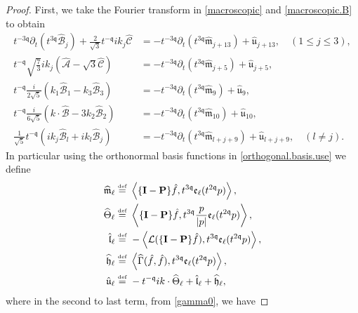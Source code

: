 \documentclass[reqno]{amsart}
\newcommand{\eqdef }{\overset{\mbox{\tiny{def}}}{=}}
\newcommand{\pv}{p}
\newcommand{\irnp}[2]{\left\langle {#1},{#2} \right\rangle}
\newcommand{\qq}{\mathfrak{q}}
\newcommand{\tmq}{t^{-\qq}}
\newcommand{\tqq}{t^{2\qq}}
\newcommand{\tTq}{t^{3\qq}}
\newcommand{\tmTq}{t^{-3\qq}}
\newcommand{\linL}{\mathcal{L}}
\newcommand{\micro}{{\bf \{I- P\}}}
\newcommand{\highG}{\Theta}
\theoremstyle{definition}
\numberwithin{equation}{section}
\numberwithin{theorem}{section}
\begin{document}
\begin{proof}
First, we take the Fourier transform in \eqref{macroscopic} and \eqref{macroscopic.B} to obtain 
\begin{align} \label{macroscopic.FT.B}
 \tmTq\partial_t \left(\tTq \widehat{\mathcal{B}}_j \right) 
 +
\frac{2}{\sqrt{3}}\tmq ik_j  \widehat{\mathcal{C}} 
&=
-\tmTq  \partial_t\left( \tTq \widehat{\mathfrak{m}}_{j+13} \right)+\hat{\mathfrak{u}}_{j+13} , \quad (1 \leq j \leq 3),
\\ 
\label{macroscopic.FT.AC}
\tmq\sqrt{\frac{7}{3}}ik_j \left(\widehat{\mathcal{A}}
-
\sqrt{3}\widehat{\mathcal{C}} \right)
&=-\tmTq  \partial_t\left( \tTq \widehat{\mathfrak{m}}_{j+5} \right)+\hat{\mathfrak{u}}_{j+5},
\\ \label{macroscopic.FT.Bthree}
\tmq\frac{i}{2\sqrt{5}} \left( k_1 \widehat{\mathcal{B}}_1 - k_3 \widehat{\mathcal{B}}_3\right)
&=-\tmTq  \partial_t\left( \tTq \widehat{\mathfrak{m}}_{9} \right)+\widehat{\mathfrak{u}}_{9},
 \\ \label{macroscopic.FT.Btwo}
\tmq\frac{i}{6\sqrt{5}}\left( k\cdot \widehat{\mathcal{B}}-3k_2 \widehat{\mathcal{B}}_2\right)
&=-\tmTq  \partial_t\left( \tTq \widehat{\mathfrak{m}}_{10} \right)+\widehat{\mathfrak{u}}_{10},
 \\ \label{macroscopic.FT.Bjl}
\frac{1}{\sqrt{5}}  \tmq\left(ik_j \widehat{\mathcal{B}}_l+ik_l \widehat{\mathcal{B}}_j \right)
&=-\tmTq  \partial_t\left( \tTq \widehat{\mathfrak{m}}_{l+j+9} \right)+\hat{\mathfrak{u}}_{l+j+9},
\quad (l\neq j).
\end{align}
In particular using the orthonormal basis functions in \eqref{orthogonal.basis.use} we define
\begin{align} \notag
\widehat{\mathfrak{m}}_{\ell} \eqdef &~  \irnp{  \micro \hat{f}}{\tTq \mathfrak{e}_{\ell}(\tqq \pv)},
\\ \label{rhs.def.terms.FT}
\widehat{\highG}_{\ell} \eqdef &~  \irnp{\micro \hat{f}}{\tTq \frac{\pv}{| \pv|}\mathfrak{e}_{\ell}(\tqq \pv)},
\\ \notag
\hat{\mathfrak{l}}_{\ell} \eqdef &~  -\irnp{\linL(\micro \hat{f})}{\tTq \mathfrak{e}_{\ell}(\tqq \pv)},
\\ \notag
\widehat{\mathfrak{h}}_{\ell}  \eqdef &~ 
\irnp{\widehat{\Gamma}(\hat{f},\hat{f})}{\tTq \mathfrak{e}_{\ell}(\tqq \pv)},
 \\ \notag
\hat{\mathfrak{u}}_{\ell} \eqdef &~  -\tmq ik \cdot \widehat{\highG}_{\ell}
 +\hat{\mathfrak{l}}_{\ell}+\widehat{\mathfrak{h}}_{\ell},
\end{align}
where in the second to last term, from \eqref{gamma0}, we have

\end{proof}
\end{document}
